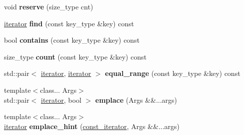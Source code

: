 \begin{DoxyCompactItemize}
\item 
void {\bfseries reserve} (size\+\_\+type cnt)\hypertarget{classspp___1_1sparse__hash__set_aa7ff792f18b038054b807ab9e2170ff7}{}\label{classspp___1_1sparse__hash__set_aa7ff792f18b038054b807ab9e2170ff7}

\item 
\hyperlink{classspp___1_1_two__d__iterator}{iterator} {\bfseries find} (const key\+\_\+type \&key) const \hypertarget{classspp___1_1sparse__hash__set_a3426c544399be55de9518b9ade726742}{}\label{classspp___1_1sparse__hash__set_a3426c544399be55de9518b9ade726742}

\item 
bool {\bfseries contains} (const key\+\_\+type \&key) const \hypertarget{classspp___1_1sparse__hash__set_aa988da67387b9e2e95319cabbf3650c5}{}\label{classspp___1_1sparse__hash__set_aa988da67387b9e2e95319cabbf3650c5}

\item 
size\+\_\+type {\bfseries count} (const key\+\_\+type \&key) const \hypertarget{classspp___1_1sparse__hash__set_a97530834d529116f59d00c2166a38562}{}\label{classspp___1_1sparse__hash__set_a97530834d529116f59d00c2166a38562}

\item 
std\+::pair$<$ \hyperlink{classspp___1_1_two__d__iterator}{iterator}, \hyperlink{classspp___1_1_two__d__iterator}{iterator} $>$ {\bfseries equal\+\_\+range} (const key\+\_\+type \&key) const \hypertarget{classspp___1_1sparse__hash__set_a112267446459bd05191dd36aecf3844f}{}\label{classspp___1_1sparse__hash__set_a112267446459bd05191dd36aecf3844f}

\item 
{\footnotesize template$<$class... Args$>$ }\\std\+::pair$<$ \hyperlink{classspp___1_1_two__d__iterator}{iterator}, bool $>$ {\bfseries emplace} (Args \&\&...args)\hypertarget{classspp___1_1sparse__hash__set_af3a416dcfe1b086ced0770e6464d5e25}{}\label{classspp___1_1sparse__hash__set_af3a416dcfe1b086ced0770e6464d5e25}

\item 
{\footnotesize template$<$class... Args$>$ }\\\hyperlink{classspp___1_1_two__d__iterator}{iterator} {\bfseries emplace\+\_\+hint} (\hyperlink{classspp___1_1_two__d__iterator}{const\+\_\+iterator}, Args \&\&...args)\hypertarget{classspp___1_1sparse__hash__set_a1cbc17d2c06e725109c87fa2ab59cee9}{}\label{classspp___1_1sparse__hash__set_a1cbc17d2c06e725109c87fa2ab59cee9}


\end{DoxyCompactItemize}
